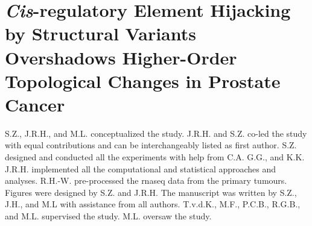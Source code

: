 \chapter{\emph{Cis}-regulatory Element Hijacking by Structural Variants Overshadows Higher-Order Topological Changes in Prostate Cancer}

S.Z., J.R.H., and M.L. conceptualized the study.
J.R.H. and S.Z. co-led the study with equal contributions and can be interchangeably listed as first author.
S.Z. designed and conducted all the experiments with help from C.A. G.G., and K.K.
J.R.H. implemented all the computational and statistical approaches and analyses.
R.H.-W. pre-processed the \gls{rnaseq} data from the primary tumours.
Figures were designed by S.Z. and J.R.H.
The manuscript was written by S.Z., J.H., and M.L with assistance from all authors.
T.v.d.K., M.F., P.C.B., R.G.B., and M.L. supervised the study.
M.L. oversaw the study.






% 
